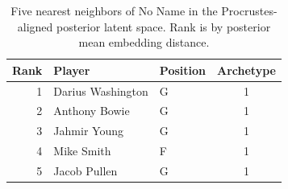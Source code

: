 \begin{table}[htbp]
  \centering\small
  \begin{tabular}{rllc}
    \toprule
    Rank & Player & Position & Archetype \\
    \midrule
    1 & Darius Washington & G & 1 \\
    2 & Anthony Bowie & G & 1 \\
    3 & Jahmir Young & G & 1 \\
    4 & Mike Smith & F & 1 \\
    5 & Jacob Pullen & G & 1 \\
    \bottomrule
  \end{tabular}
  \caption{Five nearest neighbors of No Name in the Procrustes-aligned posterior latent space. Rank is by posterior mean embedding distance.}
\end{table}

